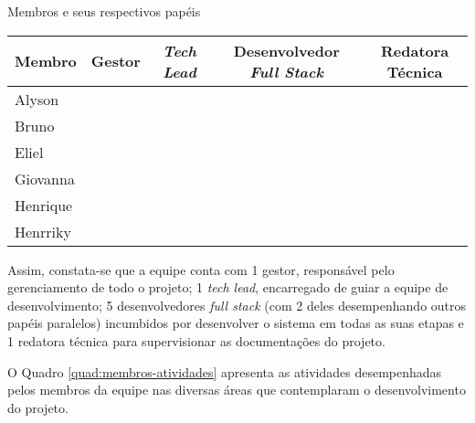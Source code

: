 \begin{quadro}[ht]
	\setlength{\tabcolsep}{3pt}
	\begin{center}
		\caption{\label{frame:distribuicao-papeis}Membros e seus respectivos papéis}
		\begin{tabular}{|l|c|c|c|c|}
			\hline
			\textbf{Membro} & \textbf{Gestor} & \textbf{\textit{Tech Lead}} & \textbf{Desenvolvedor \textit{Full Stack}} & \textbf{Redatora Técnica} \\
			\hline
			Alyson & \checkmark &  & \checkmark &  \\
			\hline
			Bruno &  &  & \checkmark &  \\
			\hline
			Eliel &  &  & \checkmark &  \\
			\hline
			Giovanna &  &  &  & \checkmark \\
			\hline
			Henrique &  &  & \checkmark &  \\
			\hline
			Henrriky &  & \checkmark & \checkmark &  \\
			\hline
		\end{tabular}
	\end{center}
\end{quadro}

\indent Assim, constata-se que a equipe conta com 1 gestor, responsável pelo gerenciamento de todo o projeto; 1 \textit{tech lead}, encarregado de guiar a equipe de desenvolvimento; 5 desenvolvedores \textit{full stack} (com 2 deles desempenhando outros papéis paralelos) incumbidos por desenvolver o sistema em todas as suas etapas e 1 redatora técnica para supervisionar as documentações do projeto. 

O Quadro \ref{quad:membros-atividades} apresenta as atividades desempenhadas pelos membros da equipe nas diversas áreas que contemplaram o desenvolvimento do projeto.

